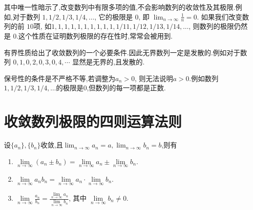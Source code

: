 \begin{remark}
    其中唯一性暗示了,改变数列中有限多项的值,不会影响数列的收敛性及其极限.例如,对于数列 $1, 1/2, 1/3, 1/4, \dots$, 它的极限是 $0$, 即 $\lim_{n \to \infty} \frac{1}{n} = 0$. 如果我们改变数列的前 $10$项, 如$1,1,1,1,1,1,1,1,1,1,1/11,1/12,1/13,1/14,\dots$, 则数列的极限仍然是 $0$.这个性质在证明数列极限的存在性时,常常会被用到.

有界性质给出了收敛数列的一个必要条件.因此无界数列一定是发散的.例如对于数列 $0,1,0,2,0,3,0,4,\cdots$ 显然是无界的,且发散的.

保号性的条件是不严格不等,若调整为$a_n >0$, 则无法说明$a>0$.例如数列$1, 1/2, 1/3, 1/4, \dots$的极限是$0$,但数列的每一项都是正数.
\end{remark}




\section{收敛数列极限的四则运算法则}

\begin{theorem}[收敛数列极限的四则运算法则]\label{thm:sequence_limit_arithmetic}
    设$\{a_n\},\{b_n\}$收敛,且$\lim_{n \to \infty} a_n = a, \lim_{n \to \infty} b_n = b$,则有

    \begin{enumerate}
        \item $\lim\limits_{n \to \infty} (a_n \pm b_n) = \lim\limits_{n \to \infty} a_n \pm \lim\limits_{n \to \infty} b_n$.
        \item $\lim\limits_{n \to \infty} a_n b_n = \lim\limits_{n \to \infty} a_n \cdot \lim\limits_{n \to \infty} b_n$.
        \item $\lim\limits_{n \to \infty} \displaystyle \frac{a_n}{b_n} = \displaystyle \frac{\lim\limits_{n \to \infty} a_n}{\lim\limits_{n \to \infty} b_n}$, 其中 $\lim\limits_{n \to \infty} b_n \neq 0$.
    \end{enumerate}
    
\end{theorem}

